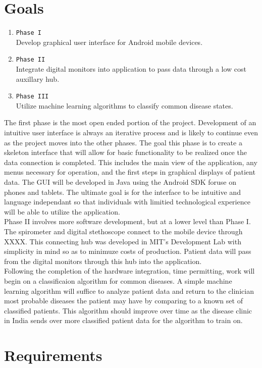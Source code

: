 \documentclass{article}
\begin{document}
\section{Goals}
\begin{enumerate}
\item[] \texttt{Phase I}\\ Develop graphical user interface for Android mobile devices.
\item[] \texttt{Phase II} \\ Integrate digital monitors into application to pass data through a low cost auxillary hub.
\item[] \texttt{Phase III} \\ Utilize machine learning algorithms to classify common disease states.
\end{enumerate}

The first phase is the most open ended portion of the project. Development of an intuitive user interface is always an iterative process and is likely to continue even as the project moves into the other phases. The goal this phase is to create a skeleton interface that will allow for basic functionality to be realized once the data connection is completed. This includes the main view of the application, any menus necessary for operation, and the first steps in graphical displays of patient data. The GUI will be developed in Java using the Android SDK foruse on phones and tablets. The ultimate goal is for the interface to be intuitive and language independant so that individuals with limitied technological experience will be able to utilize the application. \\

Phase II involves more software development, but at a lower level than Phase I. The  spirometer and digital stethoscope connect to the mobile device through XXXX. This connecting hub was developed in MIT's Development Lab with simplicity in mind so as to minimuze costs of production. Patient data will pass from the digital monitors through this hub into the application. \\

Following the completion of the hardware integration, time permitting, work will begin on a classificaion algorithm for common diseases. A simple machine learning algorithm will suffice to analyze patient data and return to the clinician most probable diseases the patient may have by comparing to a known set of classified patients. This algorithm should improve over time as the disease clinic in India sends over more classified patient data for the algorithm to train on. \\

\section{Requirements}
\end{document}
